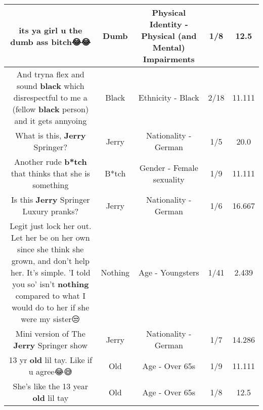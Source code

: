 \documentclass[11pt]{article}
\newlength\mylength
\begin{document}
\begin{center}
\begin{longtable}{|C{.65\mylength}|C{.30\mylength}|C{.12\mylength}|C{.12\mylength}|C{.12\mylength}|}
  \small its ya girl u the \textbf{dumb} ass bitch😂😂\normalsize   & Dumb & Physical Identity - Physical (and Mental) Impairments & 1/8 & 12.5 \\  \hline
  \small And tryna flex and sound \textbf{black} which disrespectful to me a (fellow \textbf{black} person) and it gets annyoing\normalsize   & Black & Ethnicity - Black & 2/18 & 11.111 \\  \hline
  \small What is this, \textbf{Jerry} Springer?\normalsize   & Jerry & Nationality - German & 1/5 & 20.0 \\  \hline
  \small Another rude \textbf{b*tch} that thinks that she is something\normalsize   & B*tch & Gender - Female sexuality & 1/9 & 11.111 \\  \hline
  \small Is this \textbf{Jerry} Springer Luxury pranks?\normalsize   & Jerry & Nationality - German & 1/6 & 16.667 \\  \hline
  \small Legit just lock her out. Let her be on her own since she think she grown, and don't help her. It's simple. 'I told you so' isn't \textbf{nothing} compared to what I would do to her if she were my sister😒\normalsize   & Nothing & Age - Youngsters & 1/41 & 2.439 \\  \hline
  \small Mini version of The \textbf{Jerry} Springer show\normalsize   & Jerry & Nationality - German & 1/7 & 14.286 \\  \hline
  \small 13 yr \textbf{old} lil tay. Like if u agree😂😅\normalsize   & Old & Age - Over 65s & 1/9 & 11.111 \\  \hline
  \small She's like the 13 year \textbf{old} lil tay\normalsize   & Old & Age - Over 65s & 1/8 & 12.5 \\  \hline

\end{longtable}
\end{center}
\end{document}
